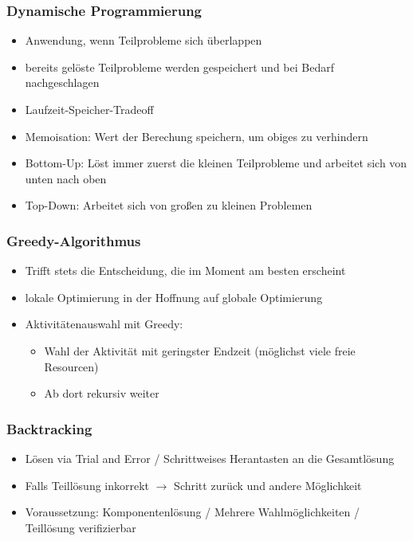         \subsubsection{Dynamische Programmierung}
            \begin{itemize}
                \item Anwendung, wenn Teilprobleme sich überlappen
                \item bereits gelöste Teilprobleme werden gespeichert und bei Bedarf nachgeschlagen
                \item Laufzeit-Speicher-Tradeoff
                \item Memoisation: Wert der Berechung speichern, um obiges zu verhindern
                \item Bottom-Up: Löst immer zuerst die kleinen Teilprobleme und arbeitet sich von unten nach oben
                \item Top-Down: Arbeitet sich von großen zu kleinen Problemen
            \end{itemize}

        \subsubsection{Greedy-Algorithmus}
            \begin{itemize}
                \item Trifft stets die Entscheidung, die im Moment am besten erscheint
                \item lokale Optimierung in der Hoffnung auf globale Optimierung
                \item Aktivitätenauswahl mit Greedy:
                    \begin{itemize}
                        \item Wahl der Aktivität mit geringster Endzeit (möglichst viele freie Resourcen)
                        \item Ab dort rekursiv weiter
                    \end{itemize}
            \end{itemize}

        \subsubsection{Backtracking}
            \begin{itemize}
                \item Lösen via Trial and Error / Schrittweises Herantasten an die Gesamtlösung
                \item Falls Teillösung inkorrekt $\rightarrow$ Schritt zurück und andere Möglichkeit
                \item Voraussetzung: Komponentenlösung / Mehrere Wahlmöglichkeiten / Teillösung verifizierbar
            \end{itemize}

